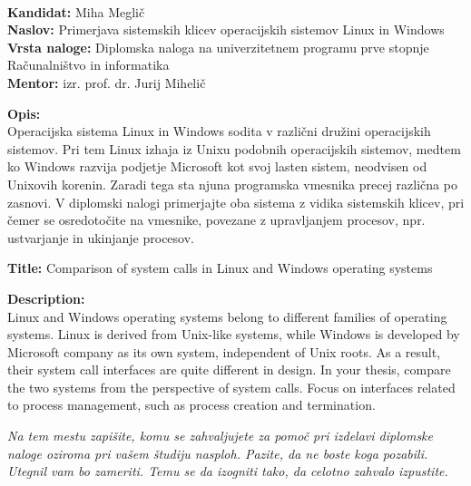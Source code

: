 \documentclass[a4paper,12pt,openright]{book}
\newcommand{\ttitle}{Primerjava sistemskih klicev operacijskih sistemov Linux in Windows}
\newcommand{\ttitleEn}{Comparison of system calls in Linux and Windows operating systems}
\newcommand{\tauthor}{Miha Meglič}
\newcommand{\clearemptydoublepage}{\newpage{\pagestyle{empty}\cleardoublepage}}
\begin{document}
\clearemptydoublepage

\thispagestyle{empty}
\
\vfill

\bigskip
\noindent\textbf{Kandidat:} \tauthor\\
\noindent\textbf{Naslov:} \ttitle\\
\noindent\textbf{Vrsta naloge:} Diplomska naloga na univerzitetnem programu prve stopnje Računalništvo in informatika \\
\noindent\textbf{Mentor:} izr. prof. dr. Jurij Mihelič

\bigskip
\noindent\textbf{Opis:}\\
Operacijska sistema Linux in Windows sodita v različni družini operacijskih sistemov.
Pri tem Linux izhaja iz Unixu podobnih operacijskih sistemov, medtem ko Windows razvija podjetje Microsoft kot svoj lasten sistem, neodvisen od Unixovih korenin.
Zaradi tega sta njuna programska vmesnika precej različna po zasnovi.
V diplomski nalogi primerjajte oba sistema z vidika sistemskih klicev, pri čemer se osredotočite na vmesnike, povezane z upravljanjem procesov, npr. ustvarjanje in ukinjanje procesov.

\bigskip
\noindent\textbf{Title:} \ttitleEn

\bigskip
\noindent\textbf{Description:}\\
Linux and Windows operating systems belong to different families of operating systems.
Linux is derived from Unix-like systems, while Windows is developed by Microsoft company as its own system, independent of Unix roots.
As a result, their system call interfaces are quite different in design.
In your thesis, compare the two systems from the perspective of system calls.
Focus on interfaces related to process management, such as process creation and termination.

\vfill



\vspace{2cm}

\clearemptydoublepage

\thispagestyle{empty}\mbox{}\vfill\null\it%
\noindent
Na tem mestu zapišite, komu se zahvaljujete za pomoč pri izdelavi diplomske naloge oziroma pri vašem študiju nasploh. Pazite, da ne boste koga pozabili. Utegnil vam bo zameriti. Temu se da izogniti tako, da celotno zahvalo izpustite.
\rm\normalfont

\clearemptydoublepage
\end{document}
